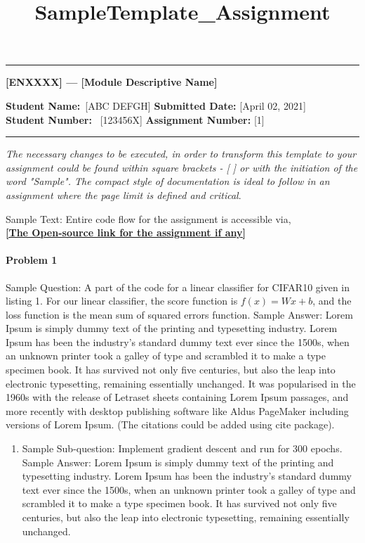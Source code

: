 \documentclass[11pt]{scrartcl}
\title{SampleTemplate_Assignment} %
\begin{document}
\begin{center}
	\hrule
	\vspace{.4cm}
	{\textbf { \large [ENXXXX] --- [Module Descriptive Name]}}
\end{center}
{\textbf{Student Name:}\ [ABC DEFGH] \hspace{\fill} \textbf{Submitted Date:} [April 02, 2021]   \\
{ \textbf{Student Number:}} \ [123456X] \hspace{\fill} \textbf{Assignment Number:} [1] \\
	\hrule

\bigskip

\textit{The necessary changes to be executed, in order to transform this template to your assignment could be found within square brackets - [ ] or with the initiation of the word "Sample". The compact style of documentation is ideal to follow in an assignment where the page limit is defined and critical}.

Sample Text: Entire code flow for the assignment is accessible via, \\ 
\textbf{\url{[The Open-source link for the assignment if any]}}

\paragraph*{Problem 1} %
Sample Question: A part of the code for a linear classifier for CIFAR10 given in listing 1. For our linear classifier, the score function is $f(x) = Wx + b$, and the loss function is the mean sum of squared errors function.
\newline
Sample Answer: Lorem Ipsum is simply dummy text of the printing and typesetting industry. Lorem Ipsum has been the industry's standard dummy text ever since the 1500s, when an unknown printer took a galley of type and scrambled it to make a type specimen book. It has survived not only five centuries, but also the leap into electronic typesetting, remaining essentially unchanged. It was popularised in the 1960s with the release of Letraset sheets containing Lorem Ipsum passages, and more recently with desktop publishing software like Aldus PageMaker including versions of Lorem Ipsum.\cite{A1} (The citations could be added using cite package).

\begin{enumerate}[label=(\alph*)]
\item Sample Sub-question: Implement gradient descent and run for 300 epochs.
\newline Sample Answer: Lorem Ipsum is simply dummy text of the printing and typesetting industry. Lorem Ipsum has been the industry's standard dummy text ever since the 1500s, when an unknown printer took a galley of type and scrambled it to make a type specimen book. It has survived not only five centuries, but also the leap into electronic typesetting, remaining essentially unchanged.


\end{enumerate}}
\end{document}
